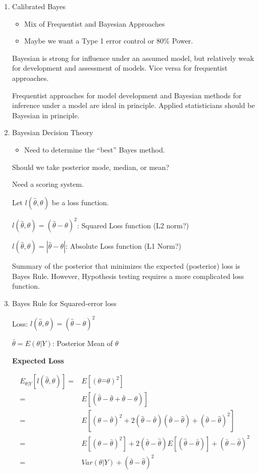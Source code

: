 \documentclass[11pt]{article}
\begin{document}
\begin{enumerate}
\item Calibrated Bayes
\label{sec:org93a7324}
\begin{itemize}
\item Mix of Frequentist and Bayesian Approaches
\item Maybe we want a Type 1 error control or 80\% Power.
\end{itemize}

Bayesian is strong for influence under an assumed model, but relatively weak for development and assessment of models. Vice versa for frequentist approaches.

Frequentist approaches for model development and Bayesian methods for inference under a model are ideal in principle. Applied statisticians should be Bayesian in principle.

\item Bayesian Decision Theory
\label{sec:org63bc0e5}
\begin{itemize}
\item Need to determine the ``best'' Bayes method.
\end{itemize}

Should we take posterior mode, median, or mean?

Need a scoring system.

Let \(l(\hat \theta, \theta)\) be a loss function.

\(l(\hat \theta, \theta) = (\hat \theta - \theta)^2\): Squared Loss function (L2 norm?)

\(l(\hat \theta, \theta) = |\hat \theta - \theta|\): Absolute Loss function (L1 Norm?)

Summary of the posterior that minimizes the expected (posterior) loss is Bayes Rule. However, Hypothesis testing requires a more complicated loss function.

\item Bayes Rule for Squared-error loss
\label{sec:orgd1a73c2}

Loss: \(l(\hat \theta, \theta) = (\hat \theta - \theta)^2\)

\(\bar \theta = E(\theta | Y)\): Posterior Mean of \(\theta\)

\textbf{Expected Loss}

\begin{equation}
\begin{split}
E_{\theta | Y} [l(\hat \theta, \theta)] = & E [(\theta \hat - \theta)^2]\\
= & E [(\hat \theta - \bar \theta + \bar \theta - \theta)]\\
= & E [(\theta - \bar \theta)^2 + 2 (\hat \theta - \bar \theta)(\bar \theta - \hat \theta) + (\bar \theta - \hat \theta)^2]\\
= & E [(\theta - \bar \theta)^2] + 2 (\bar \theta - \hat \theta) E[(\hat \theta - \bar \theta)] + (\bar \theta - \hat \theta)^2\\
= & Var(\theta | Y) + (\bar \theta - \hat \theta)^2
\end{split}
\end{equation}


\end{enumerate}
\end{document}
